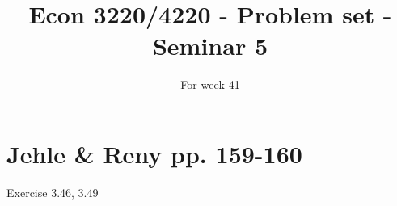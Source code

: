 \documentclass{article}
\title{Econ 3220/4220 - Problem set - Seminar 5 }
\date{For week 41}
\begin{document}
\maketitle


\section*{Jehle \& Reny pp. 159-160}

Exercise 3.46, 3.49
\end{document}
